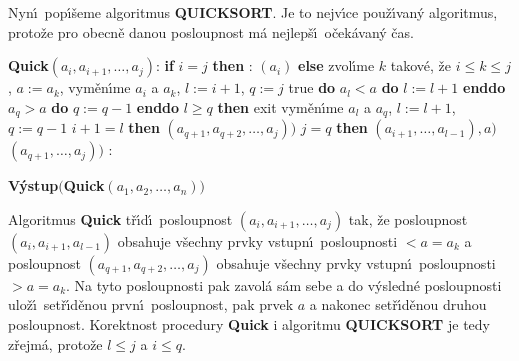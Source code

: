 \flushpar Nyn\'\i\ pop\'\i\v seme algoritmus {\bf QUICKSORT}. Je to 
nejv\'\i ce pou\-\v z\'\i van\'y algoritmus, proto\v ze pro obecn\v e danou 
posloupnost m\'a nejlep\v s\'\i\ o\v cek\'avan\'y \v cas. 
\bigskip

{\bf Quick$(a_i,a_{i+1},\dots,a_j)$}:\newline 
{\bf if} $i=j$ {\bf then}\newline 
\phantom{---}{\bf V\'ystup}: $(a_i)$\newline 
{\bf else}\newline 
\phantom{---}zvol\'\i me $k$ takov\'e, \v ze $i\le k\le j$, $a:=a_k$,\newline 
\phantom{---}vym\v en\'\i me $a_i$ a $a_k$, $l:=i+1$, $q:=j$\newline 
\phantom{---}{\bf while} true {\bf do}\newline 
\phantom{------}{\bf while} $a_l<a$ {\bf do} $l:=l+1$ {\bf enddo}\newline 
\phantom{------}{\bf while} $a_q>a$ {\bf do} $q:=q-1$ {\bf enddo}\newline
\phantom{------}{\bf if} $l\ge q$ {\bf then}\newline 
\phantom{---------}exit\newline 
\phantom{------}{\bf else}\newline 
\phantom{---------}vym\v en\'\i me $a_l$ a $a_q$, $l:=l+1$, $q:=q-1$\newline 
\phantom{------}{\bf endif}\newline
\phantom{---}{\bf enddo}\newline 
\phantom{---}{\bf if} $i+1=l$ {\bf then}\newline 
\phantom{------}{\bf V\'ystup$(a,$Quick}$(a_{q+1},a_{q+2},\dots,a_j))$\newline
\phantom{---}{\bf else}\newline 
\phantom{------}{\bf if} $j=q$ {\bf then}\newline 
\phantom{---------}{\bf V\'ystup$($Quick}$(a_{i+1},\dots,a_{l-1}),a)$\newline \phantom{------}{\bf else}\newline 
{}$(a_{q+1},\dots,a_j))$\newline 
\phantom{------}{\bf endif}\newline 
\phantom{---}{\bf endif\newline 
endif
\bigskip

QUICKSORT$(a_1,a_2,\dots,a_n)$}:\newline 
{\bf V\'ystup$($Quick$(a_1,a_2,\dots,a_n))$
\bigskip

}\flushpar Algoritmus {\bf Quick} t\v r\'\i d\'\i\ posloupnost 
$(a_i,a_{i+1},\dots,a_j)$ tak, \v ze posloupnost $(a_i,a_{i+1}
,a_{l-1})$ obsahuje v\v sechny prvky vstupn\'\i\ posloupnosti $<a=a_k$ a  
posloupnost $(a_{q+1},a_{q+2},\dots,a_j)$ obsahuje v\v sechny prvky 
vstupn\'\i\ posloupnosti $>a=a_k$. Na tyto posloupnosti pak 
zavol\'a s\'am sebe a do v\'ysledn\'e posloupnosti ulo\v z\'\i\ 
set\v r\'\i d\v enou prvn\'\i\ posloupnost, pak prvek $a$ a nakonec 
set\v r\'\i d\v enou druhou posloupnost. Korektnost procedury 
{\bf Quick}  i algoritmu {\bf QUICKSORT} je tedy z\v rejm\'a, proto\v ze 
$l\le j$ a $i\le q$. 
\medskip

